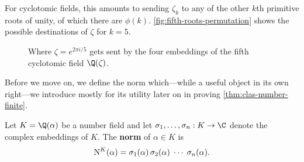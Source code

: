 For cyclotomic fields, this amounts to sending $\zeta_k$ to any of the other $k$th primitive roots of unity, of which there are $\phi(k)$. \autoref{fig:fifth-roots-permutation} shows the possible destinations of $\zeta$ for $k = 5$.

\begin{figure}
    \centering
    \caption{Where $\zeta = e^{2 \pi i / 5}$ gets sent by the four embeddings of the fifth cyclotomic field $\Q(\zeta)$.}
    \label{fig:fifth-roots-permutation}
\end{figure}

Before we move on, we define the norm which---while a useful object in its own right---we introduce mostly for its utility later on in proving \autoref{thm:clas-number-finite}.

\begin{definition}[Norm]
    Let $K = \Q(\alpha)$ be a number field and let $\sigma_1, \ldots, \sigma_n : K \to \C$ denote the complex embeddings of $K$. The \textbf{norm} of $\alpha \in K$ is
    \begin{equation}
        \operatorname{N}^K(\alpha) = \sigma_1(\alpha) \, \sigma_2(\alpha) \; \cdots \; \sigma_n(\alpha).
    \end{equation}
\end{definition}

